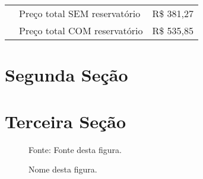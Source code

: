 \begin{table}[!ht]
{\begin{tabular}{c|l|r}
		\midrule
		
		   & Preço total SEM reservatório                         & R\$ 381,27\\
		   & Preço total COM reservatório                         & R\$ 535,85\\
		   
		\bottomrule
		\end{tabular}
		}
		{
		}
	\end{table}

\section{Segunda Seção}
\lipsum[3]

\section{Terceira Seção}
	\begin{figure}[!ht]
		\centering
		\caption{Nome desta figura.}
		\fbox{\rule[10cm]{12cm}{0cm}}
		\begin{minipage}{\textwidth}
			\centering
			{\small Fonte: Fonte desta figura.}\par
		\end{minipage}
		\label{fig:kitexposicao}
	\end{figure}
